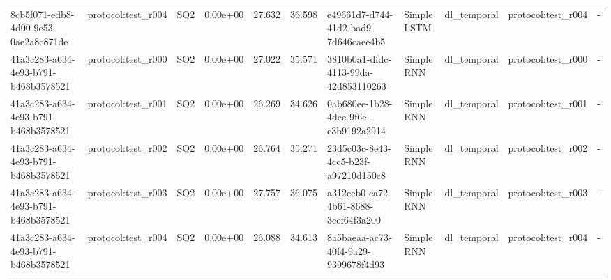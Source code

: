\begin{table}[htbp]
\begin{tabular}{llrrr}
8cb5f071-edb8-4d00-9e53-0ae2a8c871de & protocol:test\_r004 & SO2 & 0.00e+00 & 27.632 & 36.598 & e49661d7-d744-41d2-bad9-7d646caee4b5 & Simple LSTM & dl\_temporal & protocol:test\_r004 & - \\
41a3c283-a634-4e93-b791-b468b3578521 & protocol:test\_r000 & SO2 & 0.00e+00 & 27.022 & 35.571 & 3810b0a1-dfdc-4113-99da-42d853110263 & Simple RNN & dl\_temporal & protocol:test\_r000 & - \\
41a3c283-a634-4e93-b791-b468b3578521 & protocol:test\_r001 & SO2 & 0.00e+00 & 26.269 & 34.626 & 0ab680ee-1b28-4dee-9f6e-e3b9192a2914 & Simple RNN & dl\_temporal & protocol:test\_r001 & - \\
41a3c283-a634-4e93-b791-b468b3578521 & protocol:test\_r002 & SO2 & 0.00e+00 & 26.764 & 35.271 & 23d5c03c-8e43-4cc5-b23f-a97210d150c8 & Simple RNN & dl\_temporal & protocol:test\_r002 & - \\
41a3c283-a634-4e93-b791-b468b3578521 & protocol:test\_r003 & SO2 & 0.00e+00 & 27.757 & 36.075 & a312ceb0-ca72-4b61-8688-3cef64f3a200 & Simple RNN & dl\_temporal & protocol:test\_r003 & - \\
41a3c283-a634-4e93-b791-b468b3578521 & protocol:test\_r004 & SO2 & 0.00e+00 & 26.088 & 34.613 & 8a5baeaa-ac73-40f4-9a29-9399678f4d93 & Simple RNN & dl\_temporal & protocol:test\_r004 & - \\
\hline
\end{tabular}
\end{table}
